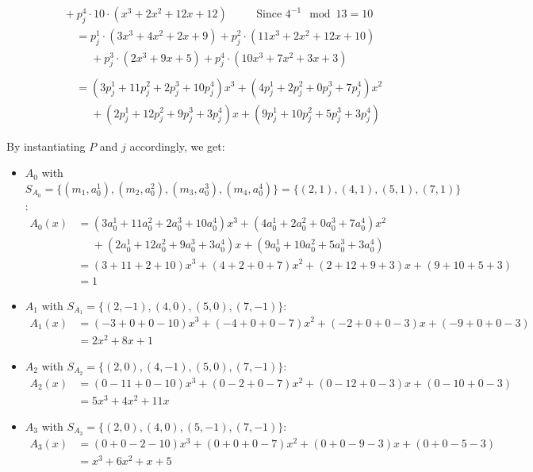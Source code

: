 \begin{enumerate}
\begin{align*}
            &\phantom{=} + p_j^4\cdot 10\cdot(x^3+2x^2+12x+12) &&\quad \text{Since } 4^{-1}\mod 13=10
    \end{align*}
    \begin{align*}
        \phantom{P_j(x)}&=p_j^1\cdot (3x^3+4x^2+2x+9) + p_j^2\cdot (11x^3+2x^2+12x+10)\\
            &\phantom{=} + p_j^3\cdot (2x^3+9x+5) + p_j^4\cdot (10x^3+7x^2+3x+3)\\
            &\\
            \phantom{P_j(x)}&=(3p_j^1+11p_j^2+2p_j^3+10p_j^4)x^3 + (4p_j^1+2p_j^2+0p_j^3+7p_j^4)x^2\\
            &\phantom{=} + (2p_j^1+12p_j^2+9p_j^3+3p_j^4)x + (9p_j^1+10p_j^2+5p_j^3+3p_j^4)
    \end{align*}

    By instantiating $P$ and $j$ accordingly, we get:
    \begin{itemize}
        \item $A_0$ with $S_{A_0}=\{(m_1,a_0^1), (m_2, a_0^2), (m_3, a_0^3), (m_4, a_0^4)\}=\{(2,1), (4,1), (5,1), (7,1)\}$:
        {\setlength{\mathindent}{2pt}
        \begin{align*}
            A_0(x) &= (3a_0^1+11a_0^2+2a_0^3+10a_0^4)x^3 + (4a_0^1+2a_0^2+0a_0^3+7a_0^4)x^2\\
            &\phantom{=} + (2a_0^1+12a_0^2+9a_0^3+3a_0^4)x + (9a_0^1+10a_0^2+5a_0^3+3a_0^4)
            &\\
            &=(3+11+2+10)x^3 + (4+2+0+7)x^2 + (2+12+9+3)x + (9+10+5+3)\\
            &=1
        \end{align*}
        }
        \item $A_1$ with $S_{A_1}=\{(2,-1), (4,0), (5,0), (7,-1)\}$:
        {\setlength{\mathindent}{2pt}
        \begin{align*}
            A_1(x) &=(-3+0+0-10)x^3 + (-4+0+0-7)x^2 + (-2+0+0-3)x + (-9+0+0-3)\\
            &=2x^2 + 8x + 1
        \end{align*}
        }
        \item $A_2$ with $S_{A_2}=\{(2,0), (4,-1), (5,0), (7,-1)\}$:
        {\setlength{\mathindent}{2pt}
        \begin{align*}
            A_2(x) &=(0-11+0-10)x^3 + (0-2+0-7)x^2 + (0-12+0-3)x + (0-10+0-3)\\
            &=5x^3 + 4x^2 + 11x
        \end{align*}
        }
        \item $A_3$ with $S_{A_3}=\{(2,0), (4,0), (5,-1), (7,-1)\}$:
        {\setlength{\mathindent}{2pt}
        \begin{align*}
            A_3(x) &=(0+0-2-10)x^3 + (0+0+0-7)x^2 + (0+0-9-3)x + (0+0-5-3)\\
            &=x^3 + 6x^2 + x + 5
        \end{align*}
        }


\end{itemize}
\end{enumerate}
